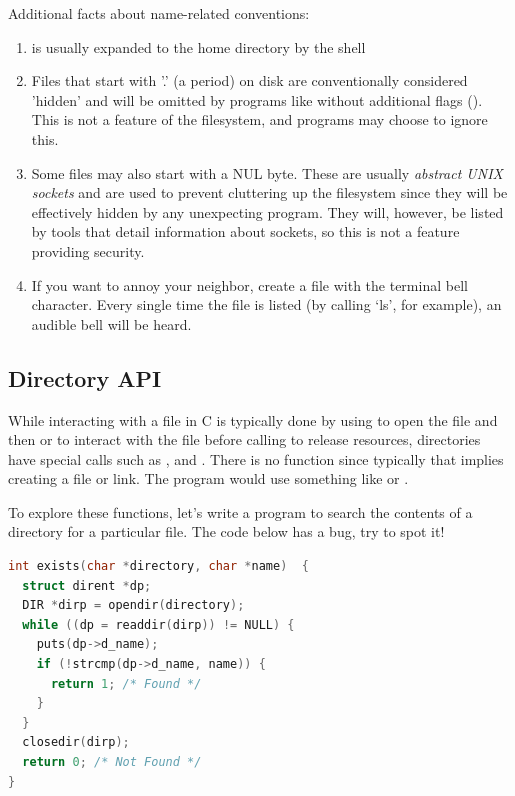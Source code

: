 Additional facts about name-related conventions:

\begin{enumerate}
    \item \keyword{\textasciitilde} is usually expanded to the home directory by the shell
    \item Files that start with '.' (a period) on disk are conventionally considered 'hidden' and will be omitted by programs like  without additional flags ().
        This is not a feature of the filesystem, and programs may choose to ignore this.
    \item Some files may also start with a NUL byte.
            These are usually \emph{abstract UNIX sockets} and are used to prevent cluttering up the filesystem since they will be effectively hidden by any unexpecting program.
            They will, however, be listed by tools that detail information about sockets, so this is not a feature providing security.
    \item If you want to annoy your neighbor, create a file with the terminal bell character.
        Every single time the file is listed (by calling `ls', for example), an audible bell will be heard.
\end{enumerate}

\subsection{Directory API}

While interacting with a file in C is typically done by using  to open the file and then  or  to interact with the file before calling  to release resources, directories have special calls such as ,  and .
There is no function  since typically that implies creating a file or link.
The program would use something like  or .

To explore these functions, let's write a program to search the contents of a directory for a particular file.
The code below has a bug, try to spot it!

\begin{lstlisting}[language=C]
int exists(char *directory, char *name)  {
  struct dirent *dp;
  DIR *dirp = opendir(directory);
  while ((dp = readdir(dirp)) != NULL) {
    puts(dp->d_name);
    if (!strcmp(dp->d_name, name)) {
      return 1; /* Found */
    }
  }
  closedir(dirp);
  return 0; /* Not Found */
}
\end{lstlisting}

